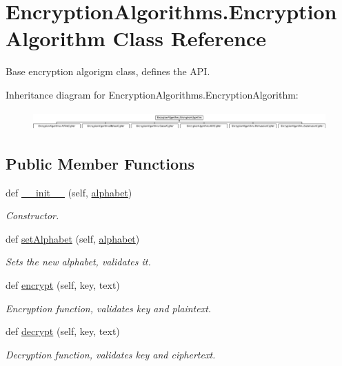 \hypertarget{classEncryptionAlgorithms_1_1EncryptionAlgorithm}{}\section{Encryption\+Algorithms.\+Encryption\+Algorithm Class Reference}
\label{classEncryptionAlgorithms_1_1EncryptionAlgorithm}


Base encryption algorigm class, defines the A\+PI.  


Inheritance diagram for Encryption\+Algorithms.\+Encryption\+Algorithm\+:\begin{figure}[H]
\begin{center}
\leavevmode
\includegraphics[height=0.723514cm]{classEncryptionAlgorithms_1_1EncryptionAlgorithm}
\end{center}
\end{figure}
\subsection*{Public Member Functions}
\begin{DoxyCompactItemize}
\item 
def \mbox{\hyperlink{classEncryptionAlgorithms_1_1EncryptionAlgorithm_a8916994ba410f389e2cdfd5d77c2d8fa}{\+\_\+\+\_\+init\+\_\+\+\_\+}} (self, \mbox{\hyperlink{classEncryptionAlgorithms_1_1EncryptionAlgorithm_ad43b0d5680d18b7bc62848864e496684}{alphabet}})
\begin{DoxyCompactList}\small\item\em Constructor. \end{DoxyCompactList}\item 
def \mbox{\hyperlink{classEncryptionAlgorithms_1_1EncryptionAlgorithm_af584e5bbf78770ca1d8f8c08c06e0dc2}{set\+Alphabet}} (self, \mbox{\hyperlink{classEncryptionAlgorithms_1_1EncryptionAlgorithm_ad43b0d5680d18b7bc62848864e496684}{alphabet}})
\begin{DoxyCompactList}\small\item\em Sets the new alphabet, validates it. \end{DoxyCompactList}\item 
def \mbox{\hyperlink{classEncryptionAlgorithms_1_1EncryptionAlgorithm_ac8e6b3a5b536ba2b3ed86f4f635be679}{encrypt}} (self, key, text)
\begin{DoxyCompactList}\small\item\em Encryption function, validates key and plaintext. \end{DoxyCompactList}\item 
def \mbox{\hyperlink{classEncryptionAlgorithms_1_1EncryptionAlgorithm_ab0666e938c8fbcce0934f145288397d9}{decrypt}} (self, key, text)
\begin{DoxyCompactList}\small\item\em Decryption function, validates key and ciphertext. \end{DoxyCompactList}\end{DoxyCompactItemize}
